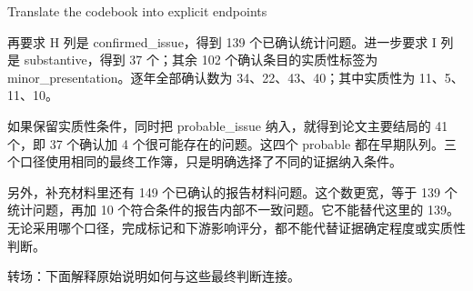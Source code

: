 \documentclass[10pt,aspectratio=169]{beamer}
\begin{document}
\begin{frame}[t]{Translate the codebook into explicit endpoints}
{再要求 H 列是 confirmed\_issue，得到 139 个已确认统计问题。进一步要求 I 列是 substantive，得到 37 个；其余 102 个确认条目的实质性标签为 minor\_presentation。逐年全部确认数为 34、22、43、40；其中实质性为 11、5、11、10。
\par
如果保留实质性条件，同时把 probable\_issue 纳入，就得到论文主要结局的 41 个，即 37 个确认加 4 个很可能存在的问题。这四个 probable 都在早期队列。三个口径使用相同的最终工作簿，只是明确选择了不同的证据纳入条件。
\par
另外，补充材料里还有 149 个已确认的报告材料问题。这个数更宽，等于 139 个统计问题，再加 10 个符合条件的报告内部不一致问题。它不能替代这里的 139。无论采用哪个口径，完成标记和下游影响评分，都不能代替证据确定程度或实质性判断。
\par
转场：下面解释原始说明如何与这些最终判断连接。
}
\end{frame}
\end{document}
